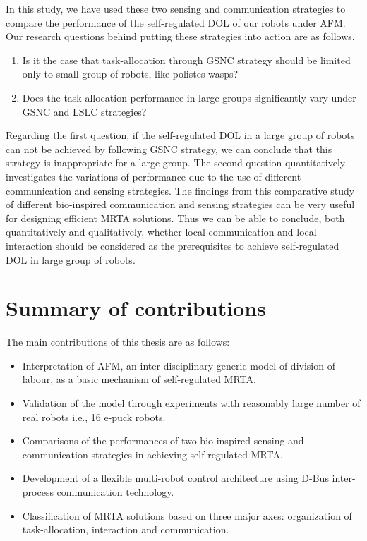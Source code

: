 In this study, we have used these two sensing and communication strategies to compare the performance of the self-regulated DOL of our robots under AFM. %
Our research questions behind putting these strategies into action are as follows.
\begin{enumerate}
\item Is it the case that task-allocation through GSNC strategy should be limited only to  small group of robots, like polistes wasps?
\item 
Does the task-allocation performance  in large groups  significantly vary under GSNC and LSLC strategies?
\end{enumerate}
Regarding the first question, if the self-regulated DOL in a large group of robots can not be achieved by following GSNC strategy, we can  conclude that this strategy is inappropriate for a large group. The second question quantitatively investigates the variations of performance due to the use of different  communication and sensing strategies.
The findings from this  comparative study of different bio-inspired  communication and sensing strategies can be very useful  for designing efficient MRTA solutions. Thus we can be able to conclude, both quantitatively and qualitatively, whether local communication and local interaction should be considered as the prerequisites to achieve self-regulated DOL in large group of robots.
\section{Summary of contributions}
The main contributions of this thesis are as follows:
\begin{itemize}
\item Interpretation of AFM, an  inter-disciplinary generic model of division of labour, as a basic mechanism of  self-regulated MRTA.
\item Validation of the model through experiments with reasonably large number of real robots i.e., 16 e-puck robots.
\item Comparisons of the performances of two bio-inspired sensing and communication strategies in achieving self-regulated MRTA.
\item Development of a flexible multi-robot control architecture using D-Bus inter-process communication technology.
\item Classification of MRTA solutions based on three major axes: organization of task-allocation, interaction and communication.
\end{itemize}
